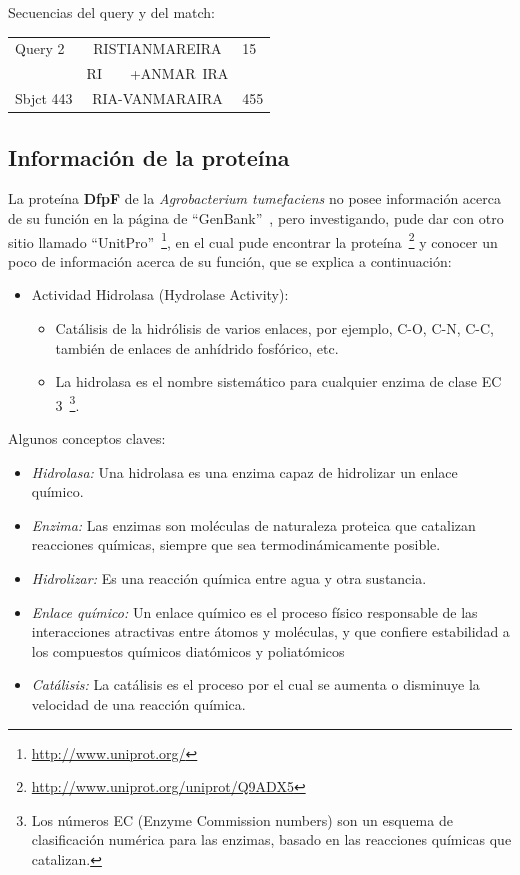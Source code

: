 Secuencias del query y del match:

\begin{tabular}{lcl}
Query  2   & RISTIANMAREIRA & 15\\
           & RI\ \ \ \ +ANMAR\ IRA & \\
Sbjct  443 & RIA-VANMARAIRA & 455\\
\end{tabular}

\subsection{Información de la proteína}
La proteína \textbf{DfpF} de la \emph{Agrobacterium tumefaciens} no
posee información acerca de su función en la página de ``GenBank''~\cite{match1}, pero investigando, pude dar con otro sitio llamado ``UnitPro''~\footnote{\url{http://www.uniprot.org/}},
en el cual pude encontrar la proteína~\footnote{\url{http://www.uniprot.org/uniprot/Q9ADX5}}
y conocer un poco de información acerca de su función, que se explica a continuación:

\begin{itemize}
	\item Actividad Hidrolasa (Hydrolase Activity):
	\begin{itemize}
		\item Catálisis de la hidrólisis de varios enlaces, por ejemplo, C-O, C-N, C-C,
			también de enlaces de anhídrido fosfórico, etc.
		\item La hidrolasa es el nombre sistemático para cualquier enzima de clase
			EC 3~\footnote{Los números EC (Enzyme Commission numbers) son un esquema de clasificación
			numérica para las enzimas, basado en las reacciones químicas que catalizan.}.
	\end{itemize}
\end{itemize}

Algunos conceptos claves:
\begin{itemize}
	\item \emph{Hidrolasa:}
		Una hidrolasa es una enzima capaz de hidrolizar un enlace químico.
	\item \emph{Enzima:}
		Las enzimas son moléculas de naturaleza proteica que catalizan
		reacciones químicas, siempre que sea termodinámicamente posible.
	\item \emph{Hidrolizar:}
		Es una reacción química entre agua y otra sustancia.
	\item \emph{Enlace químico:}
		Un enlace químico es el proceso físico responsable de las interacciones atractivas entre átomos y moléculas, y que confiere estabilidad a los compuestos químicos diatómicos y poliatómicos
	\item \emph{Catálisis:}
		La catálisis es el proceso por el cual se aumenta o disminuye la velocidad de una reacción química.
\end{itemize}

